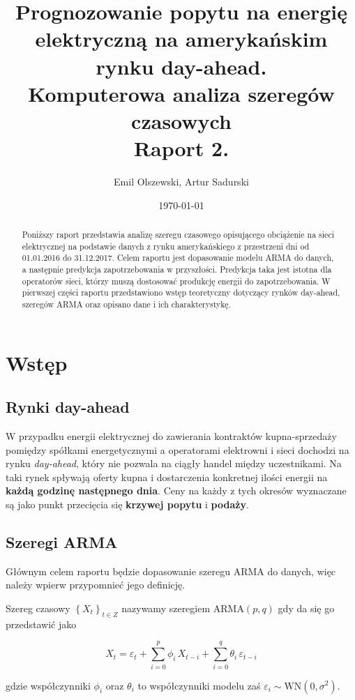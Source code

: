 \documentclass{article}
\author{Emil Olszewski, Artur Sadurski}
\date{\today}
\title{Prognozowanie popytu na energię elektryczną na amerykańskim rynku day-ahead. \\  \large Komputerowa analiza szeregów czasowych \\ \large Raport 2. }
\begin{document}
\maketitle

\begin{abstract}
Poniższy raport przedstawia analizę szeregu czasowego opisującego obciążenie na sieci elektrycznej na podstawie danych z rynku amerykańskiego z przestrzeni dni od 01.01.2016 do 31.12.2017. Celem raportu jest dopasowanie modelu ARMA do danych, a następnie predykcja zapotrzebowania w przyszłości. Predykcja taka jest istotna dla operatorów sieci, którzy muszą dostosować produkcję energii do zapotrzebowania. W pierwszej części raportu przedstawiono wstęp teoretyczny dotyczący rynków day-ahead, szeregów ARMA oraz opisano dane i ich charakterystykę. 
\end{abstract}

\section{Wstęp}

\subsection{Rynki day-ahead} 

W przypadku energii elektrycznej do zawierania kontraktów kupna-sprzedaży pomiędzy spółkami energetycznymi a operatorami elektrowni i sieci dochodzi na rynku \textit{day-ahead}, który nie pozwala na ciągły handel między uczestnikami. Na taki rynek spływają oferty kupna i dostarczenia konkretnej ilości energii na \textbf{każdą godzinę następnego dnia}. Ceny na każdy z tych okresów wyznaczane są jako punkt przecięcia się \textbf{krzywej popytu} i \textbf{podaży}. 

\subsection{Szeregi ARMA}
Głównym celem raportu będzie dopasowanie szeregu ARMA do danych, więc należy wpierw przypomnieć jego definicję. 

\begin{definition}

Szereg czasowy ${\left\lbrace X_t \right\rbrace}_{t \in Z}$ nazywamy szeregiem $\text{ARMA}(p, q)$ gdy da się go przedstawić jako

$$ X_t = \varepsilon_t + \sum_{i=0}^p \phi_i\,X_{t-i} + \sum_{i=0}^q \theta_i\,\varepsilon_{t-i} $$

gdzie współczynniki $\phi_i$ oraz $\theta_i$ to współczynniki modelu zaś $\varepsilon_i \sim \text{WN}(0, \sigma^2)$. 

\end{definition}
\end{document}
